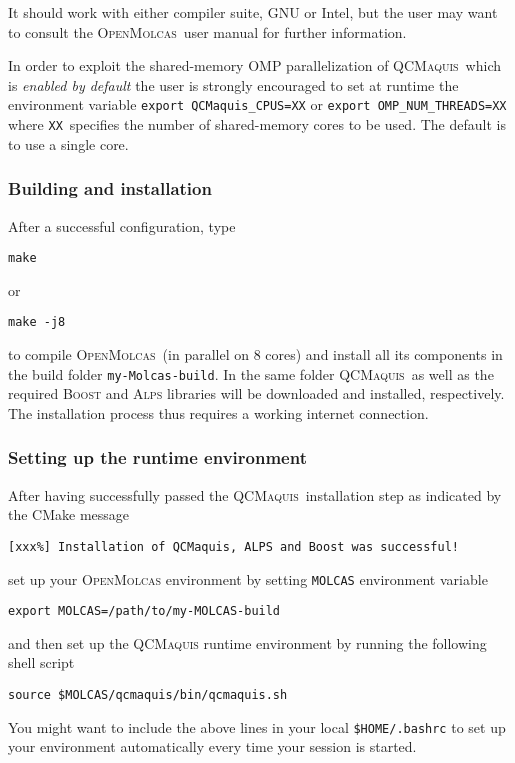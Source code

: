 \documentclass[bibliography=totoc,12pt,a4paper]{scrartcl}
\newcommand{\mol}{\textsc{OpenMolcas}}
\newcommand{\qcm}{\textsc{QCMaquis}}
\newcommand{\molbuild}{\texttt{my-Molcas-build}}
\begin{document}
\noindent It should work with either compiler suite, GNU or Intel, but the user may want to consult the \mol\ user manual for further information.

\vspace{2ex}

In order to exploit the shared-memory OMP parallelization of \qcm\ which is \emph{enabled by default}
the user is strongly encouraged to set at runtime the environment
variable \texttt{export QCMaquis\_CPUS=XX} or \texttt{export OMP\_NUM\_THREADS=XX}
where \texttt{XX}\ specifies the number of shared-memory cores to be used. The default is to use a single core.

\subsubsection{Building and installation}\label{subsubsec:build}

After a successful configuration, type
\begin{verbatim}
make
\end{verbatim}
\noindent or
\begin{verbatim}
make -j8
\end{verbatim}
to compile \mol\ (in parallel on 8 cores) and install all its components in the build folder \texttt{\molbuild}.
In the same folder \qcm\ as well as the required \textsc{Boost} and \textsc{Alps}
libraries will be downloaded and installed, respectively.
The installation process thus requires a working internet connection.

\subsubsection{Setting up the runtime environment}\label{subsubsec:runtime}

After having successfully passed the \qcm\ installation step as indicated by the CMake message
\begin{verbatim}
[xxx%] Installation of QCMaquis, ALPS and Boost was successful!
\end{verbatim}
set up your \mol{} environment by setting \texttt{MOLCAS} environment variable
\begin{verbatim}
export MOLCAS=/path/to/my-MOLCAS-build
\end{verbatim}
and then set up the \qcm{} runtime environment by running the following shell script
\begin{verbatim}
source $MOLCAS/qcmaquis/bin/qcmaquis.sh
\end{verbatim}
You might want to include the above lines in your local \texttt{\$HOME/.bashrc} to set up your environment automatically every time your session is started.
\end{document}
